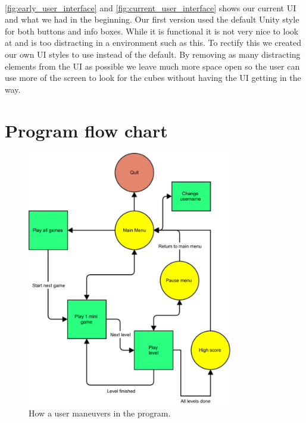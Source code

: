 \paragraph{}
\autoref{fig:early_user_interface} and \autoref{fig:current_user_interface} shows our current UI and what we had in the beginning.
Our first version used the default Unity style for both buttons and info boxes.
While it is functional it is not very nice to look at and is too distracting in a environment such as this.
To rectify this we created our own UI styles to use instead of the default.
By removing as many distracting elements from the UI as possible we leave much more space open so the user can use more of the
screen to look for the cubes without having the UI getting in the way.



\section{Program flow chart}

\begin{figure}[h]
	\capstart
	\centering
	\includegraphics[width=0.8\textwidth]{images/user_flow_chart}
	\caption[Program flow chart]{How a user maneuvers in the program.}
	\label{fig:program_flow_chart}
\end{figure}

